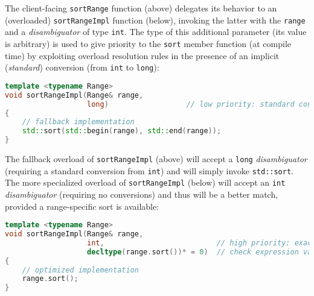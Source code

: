 \noindent The client-facing \texttt{sortRange} function (above) delegates its
behavior to an (overloaded) \texttt{sortRangeImpl} function (below),
invoking the latter with the \texttt{range} and a \emph{disambiguator}
of type \texttt{int}. The type of this additional parameter (its value
is arbitrary) is used to give priority to the \texttt{sort} member
function (at compile time) by exploiting overload resolution rules in
the presence of an implicit (\emph{standard}) conversion (from
\texttt{int} to \texttt{long}):

\begin{lstlisting}[language=C++]
template <typename Range>
void sortRangeImpl(Range& range,
                   long)                  // low priority: standard conversion
{
    // fallback implementation
    std::sort(std::begin(range), std::end(range));
}
\end{lstlisting}
    
\noindent The fallback overload of \texttt{sortRangeImpl} (above) will accept a
\texttt{long} \emph{disambiguator} (requiring a standard conversion from
\texttt{int}) and will simply invoke \texttt{std::sort}. The more
specialized overload of \texttt{sortRangeImpl} (below) will accept an
\texttt{int} \emph{disambiguator} (requiring no conversions) and thus
will be a better match, provided a range-specific sort is available:

\begin{lstlisting}[language=C++]
template <typename Range>
void sortRangeImpl(Range& range,
                   int,                          // high priority: exact match
                   decltype(range.sort())* = 0)  // check expression validity
{
    // optimized implementation
    range.sort();
}
\end{lstlisting}
    
